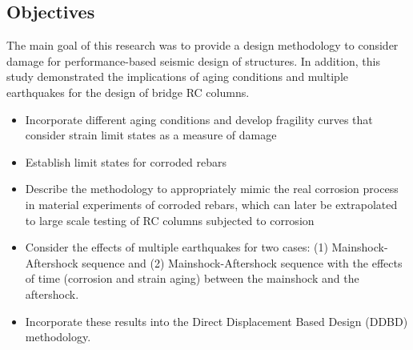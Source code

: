 \subsection{Objectives}
The main goal of this research was to provide a design methodology to consider damage for performance-based seismic design of structures. In addition, this study demonstrated the implications of aging conditions and multiple earthquakes for the design of bridge RC columns.


\begin{itemize}
	\item Incorporate different aging conditions and develop fragility curves that consider strain limit states as a measure of damage
	\item Establish limit states for corroded rebars
	\item Describe the methodology to appropriately mimic the real corrosion process in material experiments of corroded rebars, which can later be extrapolated to large scale testing of RC columns subjected to corrosion
	\item Consider the effects of multiple earthquakes for two cases: (1) Mainshock-Aftershock sequence and (2) Mainshock-Aftershock sequence with the effects of time (corrosion and strain aging) between the mainshock and the aftershock.
	\item Incorporate these results into the Direct Displacement Based Design (DDBD) methodology.
\end{itemize}